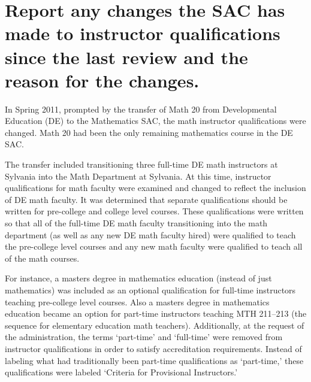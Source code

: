 



\section[Changes to instructor qualifications]{Report any changes the SAC has
 made to instructor qualifications since
the last review and the reason for the changes.}
In Spring 2011, prompted by the transfer of Math 20 from Developmental
Education (DE) to the Mathematics SAC, the math instructor qualifications were
changed.  Math 20 had been the only remaining mathematics course in the DE SAC.

The transfer included transitioning three full-time DE math instructors at
Sylvania into the Math Department at Sylvania.  At this time, instructor
qualifications for math faculty were examined and changed to reflect the
inclusion of DE math faculty.  It was determined that separate qualifications
should be written for pre-college and college level courses.  These
qualifications were written so that all of the full-time DE math faculty
transitioning into the math department (as well as any new DE math faculty
hired) were qualified to teach the pre-college level courses and any new math
faculty were qualified to teach all of the math courses.

For instance, a masters degree in mathematics education (instead of just
mathematics) was included as an optional qualification for full-time
instructors teaching pre-college level courses.  Also a masters degree in
mathematics education became an option for part-time instructors teaching MTH
211--213 (the sequence for elementary education math teachers).  Additionally,
at the request of the administration, the terms `part-time' and `full-time'
were removed from instructor qualifications in order to satisfy accreditation
requirements.  Instead of labeling what had traditionally been part-time
qualifications as `part-time,' these qualifications were labeled `Criteria for
Provisional Instructors.'

